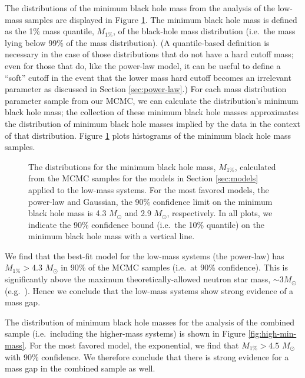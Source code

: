 \documentclass[preprint]{aastex}
\newcommand{\Msun}{M_\odot}
\begin{document}
The distributions of the minimum black hole mass from the analysis of
the low-mass samples are displayed in Figure \ref{fig:min-mass}.  The
minimum black hole mass is defined as the 1\% mass quantile,
$M_{1\%}$, of the black-hole mass distribution (i.e.\ the mass lying
below 99\% of the mass distribution).  (A quantile-based definition is
necessary in the case of those distributions that do not have a hard
cutoff mass; even for those that do, like the power-law model, it can
be useful to define a ``soft'' cutoff in the event that the lower mass
hard cutoff becomes an irrelevant parameter as discussed in Section
\ref{sec:power-law}.)  For each mass distribution parameter sample
from our MCMC, we can calculate the distribution's minimum black hole
mass; the collection of these minimum black hole masses approximates
the distribution of minimum black hole masses implied by the data in
the context of that distribution.  Figure \ref{fig:min-mass} plots
histograms of the minimum black hole mass samples.

\begin{figure}
  \begin{center}
  \end{center}
  \caption{\label{fig:min-mass} The distributions for the minimum
    black hole mass, $M_{1\%}$, calculated from the MCMC samples for
    the models in Section \ref{sec:models} applied to the low-mass
    systems.  For the most favored models, the power-law and Gaussian,
    the 90\% confidence limit on the minimum black hole mass is 4.3
    $\Msun$ and 2.9 $\Msun$, respectively.  In all plots, we indicate
    the 90\% confidence bound (i.e.\ the 10\% quantile) on the minimum
    black hole mass with a vertical line.}
\end{figure}

We find that the best-fit model for the low-mass systems (the
power-law) has $M_{1\%} > 4.3$ $\Msun$ in 90\% of the MCMC samples
(i.e.\ at 90\% confidence).  This is significantly above the maximum
theoretically-allowed neutron star mass, $\sim 3 \Msun$ (e.g.\
\citet{Kalogera1996}).  Hence we conclude that the low-mass systems
show strong evidence of a mass gap.

The distribution of minimum black hole masses for the analysis of the
combined sample (i.e.\ including the higher-mass systems) is shown in
Figure \ref{fig:high-min-mass}.  For the most favored model, the
exponential, we find that $M_{1\%} > 4.5$ $\Msun$ with 90\%
confidence.  We therefore conclude that there is strong evidence for a
mass gap in the combined sample as well.
\end{document}
